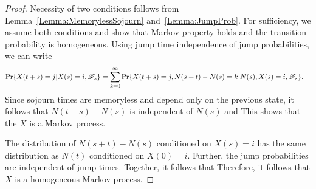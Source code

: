 \documentclass[a4paper,10pt,english]{article}
\begin{document}
\begin{proof}
Necessity of two conditions follows from Lemma~\ref{Lemma:MemorylessSojourn} and~\ref{Lemma:JumpProb}. 
For sufficiency, we assume both conditions and show that Markov property holds and the transition probability is homogeneous. 
Using jump time independence of jump probabilities, we can write %
\begin{align*}
\Pr\{ X(t+s) = j | X(s) = i, \mathscr{F}_s \} &= \sum_{ k = 0}^{\infty}\Pr\{X(t+s) = j, N(s+t) - N(s) = k | N(s), X(s) = i, \mathscr{F}_s\}.
\end{align*}
Since sojourn times are memoryless and depend only on the previous state, it follows that $N(t+s)-N(s)$ is independent of $N(s)$ and 
This shows that the $X$ is a Markov process. 

The distribution of $N(s+t) - N(s)$ conditioned on $X(s) = i$ has 
the same distribution as $N(t)$ conditioned on $X(0) = i$. 
Further, the jump probabilities are independent of jump times. 
Together, it follows that
Therefore, it follows that $X$ is a homogeneous Markov process. 
\end{proof}
\end{document}
